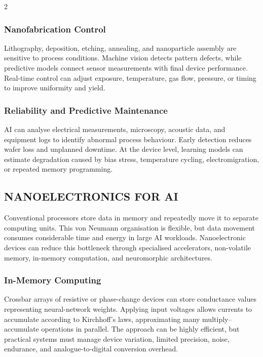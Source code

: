 \begin{multicols}{2}
  \subsubsection*{Nanofabrication Control}
  Lithography, deposition, etching, annealing, and nanoparticle assembly are sensitive to process conditions. Machine vision detects pattern defects, while predictive models connect sensor measurements with final device performance. Real-time control can adjust exposure, temperature, gas flow, pressure, or timing to improve uniformity and yield.

  \subsubsection*{Reliability and Predictive Maintenance}
  AI can analyse electrical measurements, microscopy, acoustic data, and equipment logs to identify abnormal process behaviour. Early detection reduces wafer loss and unplanned downtime. At the device level, learning models can estimate degradation caused by bias stress, temperature cycling, electromigration, or repeated memory programming.

  \subsection*{\centering\uppercase{Nanoelectronics for AI}}
  Conventional processors store data in memory and repeatedly move it to separate computing units. This von Neumann organisation is flexible, but data movement consumes considerable time and energy in large AI workloads. Nanoelectronic devices can reduce this bottleneck through specialised accelerators, non-volatile memory, in-memory computation, and neuromorphic architectures.

  \subsubsection*{In-Memory Computing}
  Crossbar arrays of resistive or phase-change devices can store conductance values representing neural-network weights. Applying input voltages allows currents to accumulate according to Kirchhoff's laws, approximating many multiply--accumulate operations in parallel. The approach can be highly efficient, but practical systems must manage device variation, limited precision, noise, endurance, and analogue-to-digital conversion overhead.

\end{multicols}

